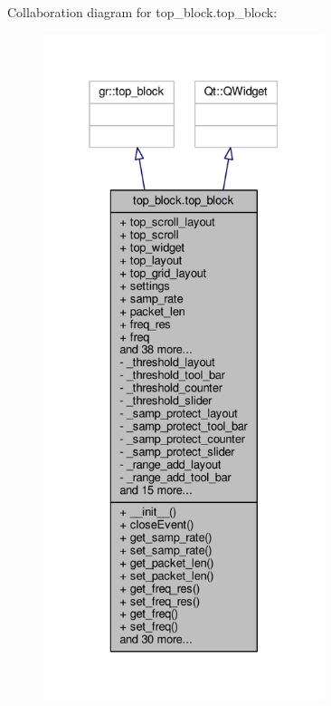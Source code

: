 Collaboration diagram for top\+\_\+block.\+top\+\_\+block\+:
\nopagebreak
\begin{figure}[H]
\begin{center}
\leavevmode
\includegraphics[height=550pt]{d5/d3c/classtop__block_1_1top__block__coll__graph}
\end{center}
\end{figure}
